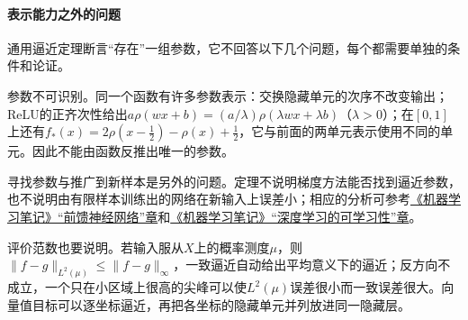 \paragraph{表示能力之外的问题}

通用逼近定理断言“存在”一组参数，它不回答以下几个问题，每个都需要单独的条件和论证。

参数不可识别。同一个函数有许多参数表示：交换隐藏单元的次序不改变输出；ReLU的正齐次性给出$a\rho(wx+b)=(a/\lambda)\rho(\lambda wx+\lambda b)$（$\lambda>0$）；在$[0,1]$上还有$f_*(x)=2\rho(x-\frac12)-\rho(x)+\frac12$，它与前面的两单元表示使用不同的单元。因此不能由函数反推出唯一的参数。

寻找参数与推广到新样本是另外的问题。定理不说明梯度方法能否找到逼近参数，也不说明由有限样本训练出的网络在新输入上误差小；相应的分析可参考\href{https://github.com/shixiaogang/notes-on-machine-learning/blob/ff88d50e0edf94a815bc6e16e76ded414f406dc2/tex/08-neural-network-models/02-feedforward-networks.tex}{《机器学习笔记》“前馈神经网络”章}和\href{https://github.com/shixiaogang/notes-on-machine-learning/blob/ff88d50e0edf94a815bc6e16e76ded414f406dc2/tex/06-foundations/02-learning-theory/05-deep-learning-theory.tex}{《机器学习笔记》“深度学习的可学习性”章}。

评价范数也要说明。若输入服从$X$上的概率测度$\mu$，则$\|f-g\|_{L^2(\mu)}\le\|f-g\|_\infty$，一致逼近自动给出平均意义下的逼近；反方向不成立，一个只在小区域上很高的尖峰可以使$L^2(\mu)$误差很小而一致误差很大。向量值目标可以逐坐标逼近，再把各坐标的隐藏单元并列放进同一隐藏层。
